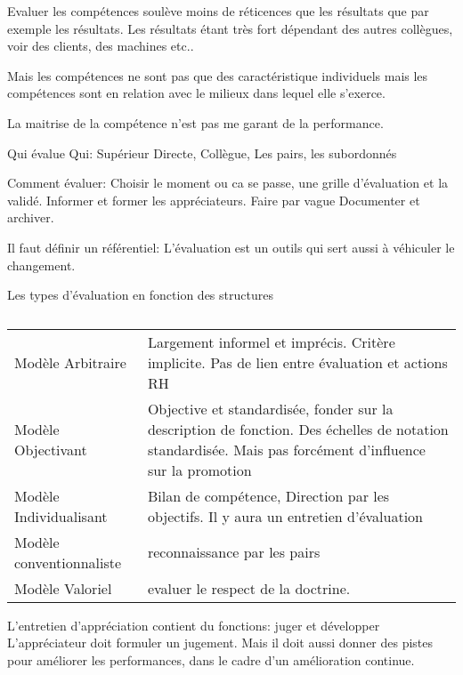 Evaluer les compétences soulève moins de réticences que les résultats que par exemple les résultats. 
Les résultats étant très fort dépendant des autres collègues, voir des clients, des machines etc.. 

Mais les compétences ne sont pas que des caractéristique individuels mais les compétences sont en relation avec le milieux dans lequel elle s'exerce. 

La maitrise de la compétence n'est pas me garant de la performance. 

Qui évalue Qui: Supérieur Directe, Collègue, Les pairs, les subordonnés


Comment évaluer: Choisir le moment ou ca se passe, une grille d'évaluation et la validé.
Informer et former les appréciateurs.
Faire par vague
Documenter et archiver.

Il faut définir un référentiel: L'évaluation est un outils qui sert aussi à véhiculer le changement. 

Les types d'évaluation en fonction des structures
\begin{table}
    \caption{}
    \label{tab:}

    \begin{center}
        \begin{tabular}{ll}
             Modèle Arbitraire & Largement informel et imprécis. Critère implicite. Pas de lien entre évaluation et actions RH \\ 
             Modèle Objectivant & Objective et standardisée, fonder sur la description de fonction. Des échelles de notation standardisée. Mais pas forcément d'influence sur la promotion\\
             Modèle Individualisant & Bilan de compétence, Direction par les objectifs. Il y aura un entretien d'évaluation \\
             Modèle conventionnaliste &  reconnaissance par les pairs\\
            Modèle Valoriel & evaluer le respect de la doctrine. \\
        \end{tabular}
    \end{center}
\end{table}

L'entretien d'appréciation contient du fonctions: juger et développer 
L'appréciateur doit formuler un jugement. 
Mais il doit aussi donner des pistes pour améliorer les performances, dans le cadre d'un amélioration continue.

